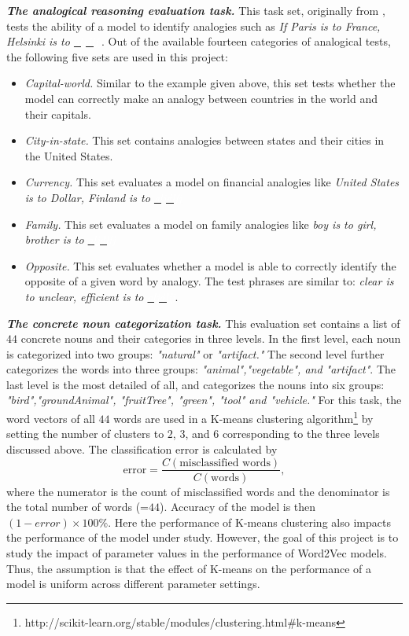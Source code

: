 \documentclass[12pt]{report}
\begin{document}
\noindent \textbf{\emph{The analogical reasoning evaluation task.}} This task set, originally from \cite{mikolov2013efficient}, tests the ability of a model to identify analogies such as 
\emph{If Paris is to France, Helsinki is to \underline{\textcolor{white}{aljdlfj}}}. Out of the available fourteen categories of analogical tests, the following five sets are
used in this project:
\begin{itemize}
	\item \emph{Capital-world.} Similar to the example given above, this set tests whether the model can correctly make an analogy between countries in the world and their capitals. 
	\item \emph{City-in-state.} This set contains analogies between
	states and their cities in the United States. 
	\item \emph{Currency.} This set evaluates a model on financial analogies like \emph{United States is to Dollar, Finland is to \underline{\textcolor{white}{aljdlfj}}}
	\item \emph{Family.}  This set evaluates a model on family analogies like \emph{boy is to girl, brother is to \underline{\textcolor{white}{aljdlfj}}}
	\item \emph{Opposite.} This set evaluates whether a model is able to correctly identify the opposite of a given word by analogy. The test phrases are similar to: \emph{clear is to unclear, efficient is to \underline{\textcolor{white}{aljdlfj}}}.
		
\end{itemize}

\noindent\textbf{\emph{The concrete noun categorization task.}} This evaluation set contains a list of $44$ concrete nouns and their categories in three levels. In the first level, each noun is categorized into two groups: \emph{"natural"} or \emph{"artifact."} The second level further categorizes the words into three groups: \emph{"animal","vegetable", \emph{and} "artifact"}. The last level is the most detailed of all, and categorizes the nouns into six groups: \emph{"bird","groundAnimal", "fruitTree", "green", "tool" \emph{and} "vehicle."}
For this task, the word vectors of all $44$ words are used in a K-means clustering algorithm\footnote{http://scikit-learn.org/stable/modules/clustering.html\#k-means} by setting the number of clusters to $2$, $3$, and $6$ corresponding to the three levels discussed above. The classification error is calculated by
\[
\text{error} = \frac{C(\text{misclassified words})}{C(\text{words})},
\] 
\noindent where the numerator is the count of misclassified words and the denominator is the total number of words (=$44$). Accuracy of the model is then $(1-error)\times 100\%$. Here the performance of K-means clustering also impacts the performance of the model under study. However, the goal of this project is to study the impact of 
parameter values in the performance of Word2Vec models. Thus, the assumption is that the effect of K-means on the performance of a model is uniform across different parameter settings.
\end{document}
